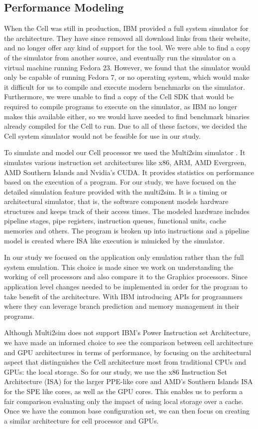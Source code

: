 \documentclass{sig-alternate-05-2015}
\begin{document}
\subsection{Performance Modeling}
When the Cell was still in production, IBM provided a full system simulator for the architecture. They have since removed all download links from their website, and no longer offer any kind of support for the tool. We were able to find a copy of the simulator from another source, and eventually run the simulator on a virtual machine running Fedora 23. However, we found that the simulator would only be capable of running Fedora 7, or no operating system, which would make it difficult for us to compile and execute modern benchmarks on the simulator. Furthermore, we were unable to find a copy of the Cell SDK that would be required to compile programs to execute on the simulator, as IBM no longer makes this available either, so we would have needed to find benchmark binaries already compiled for the Cell to run. Due to all of these factors, we decided the Cell system simulator would not be feasible for use in our study.

To simulate and model our Cell processor we used the Multi2sim simulator \cite{multi2sim}. It simulates various instruction set architectures like x86, ARM, AMD Evergreen, AMD Southern Islands and Nvidia's CUDA. It provides statistics on performance based on the execution of a program. For our study, we have focused on the detailed simulation feature provided with the multi2sim. It is a timing or architectural simulator, that is, the software component models hardware structures and keeps track of their access times. The modeled hardware includes pipeline stages, pipe registers, instruction queues, functional units, cache memories and others. The program is broken up into instructions and a pipeline model is created where ISA like execution is mimicked by the simulator. 

In our study we focused on the application only emulation rather than the full system emulation. This choice is made since we work on understanding the working of cell processors and also compare it to the Graphics processors. Since application level changes needed to be implemented in order for the program to take benefit of the architecture. With IBM introducing APIs for programmers where they can  leverage branch prediction and memory management in their programs. 

Although Multi2sim does not support IBM's Power Instruction set Architecture, we have made an informed choice to see the comparison between cell architecture and GPU architectures in terms of performance, by focusing on the architectural aspect that distinguishes the Cell architecture most from traditional CPUs and GPUs: the local storage. So for our study, we use the x86 Instruction Set Architecture (ISA) for the larger PPE-like core and AMD's Southern Islands ISA for the SPE like cores, as well as the GPU cores. This enables us to perform a fair comparison evaluating only the impact of using local storage over a cache. Once we have the common base configuration set, we can then focus on creating a similar architecture for cell processor and GPUs. 
\end{document}
